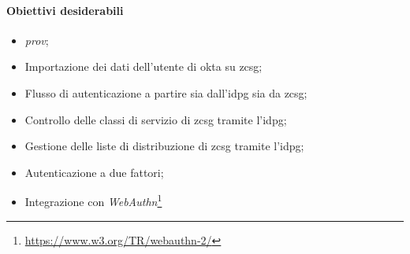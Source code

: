     \paragraph{Obiettivi desiderabili}
    \begin{itemize}
        \item \textit{\gls{prov}};
        \item Importazione dei dati dell'utente di \gls{okta} su \gls{zcsg};
        \item Flusso di autenticazione a partire sia dall'\gls{idpg} sia da \gls{zcsg};
        \item Controllo delle classi di servizio di \gls{zcsg} tramite l'\gls{idpg};
        \item Gestione delle liste di distribuzione di \gls{zcsg} tramite l'\gls{idpg};
        \item Autenticazione a due fattori;
        \item Integrazione con \textit{WebAuthn}\footnote{\url{https://www.w3.org/TR/webauthn-2/}}
    \end{itemize}

